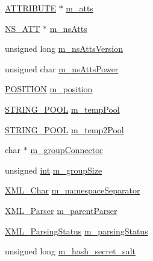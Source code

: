 \begin{DoxyCompactItemize}
\item 
\hyperlink{struct_a_t_t_r_i_b_u_t_e}{A\+T\+T\+R\+I\+B\+U\+TE} $\ast$ \hyperlink{struct_x_m_l___parser_struct_acc913a0ed49bd3a5e697064ae5682ea7}{m\+\_\+atts}
\item 
\hyperlink{struct_n_s___a_t_t}{N\+S\+\_\+\+A\+TT} $\ast$ \hyperlink{struct_x_m_l___parser_struct_a3dbb8996c7d9de7ad493d2cd7ea4d1a1}{m\+\_\+ns\+Atts}
\item 
unsigned long \hyperlink{struct_x_m_l___parser_struct_aee52b0f2c4992d22d87fefe7b2c6c278}{m\+\_\+ns\+Atts\+Version}
\item 
unsigned char \hyperlink{struct_x_m_l___parser_struct_a25f67e646832c943c9f7a96246fd3bc8}{m\+\_\+ns\+Atts\+Power}
\item 
\hyperlink{xmltok_8h_acbc9ec28b807eebf9d62149084c952b1}{P\+O\+S\+I\+T\+I\+ON} \hyperlink{struct_x_m_l___parser_struct_a8cdbfa14906bcd0a810324ccee20cea0}{m\+\_\+position}
\item 
\hyperlink{struct_s_t_r_i_n_g___p_o_o_l}{S\+T\+R\+I\+N\+G\+\_\+\+P\+O\+OL} \hyperlink{struct_x_m_l___parser_struct_a5a59ed248bf17f3dac59ec9bec74690a}{m\+\_\+temp\+Pool}
\item 
\hyperlink{struct_s_t_r_i_n_g___p_o_o_l}{S\+T\+R\+I\+N\+G\+\_\+\+P\+O\+OL} \hyperlink{struct_x_m_l___parser_struct_a21e2d3945eacb6b70f1d4fbd8404283f}{m\+\_\+temp2\+Pool}
\item 
char $\ast$ \hyperlink{struct_x_m_l___parser_struct_a3186f6c104537ac2ba89d287c5ab021d}{m\+\_\+group\+Connector}
\item 
unsigned \hyperlink{xmltok_8h_a5a0d4a5641ce434f1d23533f2b2e6653}{int} \hyperlink{struct_x_m_l___parser_struct_a1ab0f0c1938e9e22c11b531475eafd02}{m\+\_\+group\+Size}
\item 
\hyperlink{amiga_2include_2libraries_2expat_8h_a63da96463e775e1ec3a7d1f076208127}{X\+M\+L\+\_\+\+Char} \hyperlink{struct_x_m_l___parser_struct_ac7ab7b62b5c590e9392d740fb0b19430}{m\+\_\+namespace\+Separator}
\item 
\hyperlink{amiga_2include_2libraries_2expat_8h_a9dc0003156857c67b3a60b3993846013}{X\+M\+L\+\_\+\+Parser} \hyperlink{struct_x_m_l___parser_struct_a505badae81b5b219bcf6fffff0cb2765}{m\+\_\+parent\+Parser}
\item 
\hyperlink{struct_x_m_l___parsing_status}{X\+M\+L\+\_\+\+Parsing\+Status} \hyperlink{struct_x_m_l___parser_struct_acc225e1f8ac07b1665c2a052f8c3b8e2}{m\+\_\+parsing\+Status}
\item 
unsigned long \hyperlink{struct_x_m_l___parser_struct_a66c0dc32de442b691f5c1f63db64ca19}{m\+\_\+hash\+\_\+secret\+\_\+salt}
\end{DoxyCompactItemize}


